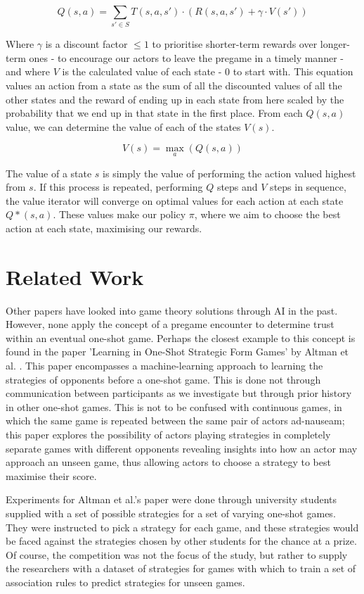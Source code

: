 \[Q\left(s,a\right)=\sum_{s' \in S}^{ }T\left(s,a,s'\right)\cdot \left(R\left(s,a,s'\right)+\gamma\cdot V\left(s'\right)\right)\]

Where $\gamma$ is a discount factor $\leq1$ to prioritise shorter-term rewards over longer-term ones - to encourage our actors to leave the pregame in a timely manner - and where $V$ is the calculated value of each state - $0$ to start with. This equation values an action from a state as the sum of all the discounted values of all the other states and the reward of ending up in each state from here scaled by the probability that we end up in that state in the first place. From each $Q(s,a)$ value, we can determine the value of each of the states $V(s)$.

\[V\left(s\right)=\max_{a}\left(Q\left(s,a\right)\right)\]

The value of a state $s$ is simply the value of performing the action valued highest from $s$. If this process is repeated, performing $Q$ steps and $V$ steps in sequence, the value iterator will converge on optimal values for each action at each state $Q*(s,a)$. These values make our policy $\pi$, where we aim to choose the best action at each state, maximising our rewards.

\section{Related Work}

Other papers have looked into game theory solutions through AI in the past. However, none apply the concept of a pregame encounter to determine trust within an eventual one-shot game. Perhaps the closest example to this concept is found in the paper 'Learning in One-Shot Strategic Form Games' by Altman et al. \cite{altman2006learning}. This paper encompasses a machine-learning approach to learning the strategies of opponents before a one-shot game. This is done not through communication between participants as we investigate but through prior history in other one-shot games. This is not to be confused with continuous games, in which the same game is repeated between the same pair of actors ad-nauseam; this paper explores the possibility of actors playing strategies in completely separate games with different opponents revealing insights into how an actor may approach an unseen game, thus allowing actors to choose a strategy to best maximise their score.

Experiments for Altman et al.'s paper were done through university students supplied with a set of possible strategies for a set of varying one-shot games. They were instructed to pick a strategy for each game, and these strategies would be faced against the strategies chosen by other students for the chance at a prize. Of course, the competition was not the focus of the study, but rather to supply the researchers with a dataset of strategies for games with which to train a set of association rules to predict strategies for unseen games.

